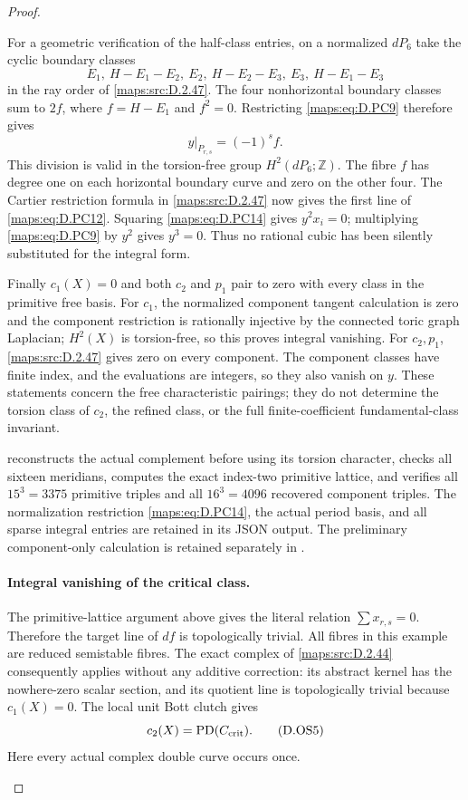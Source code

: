 \begin{proof}
\begin{enumerate}[label=\arabic*.,leftmargin=*]
For a geometric verification of the half-class entries, on a
normalized $dP_6$ take the cyclic boundary classes
\[
 E_1,\ H-E_1-E_2,\ E_2,\ H-E_2-E_3,\ E_3,\ H-E_1-E_3
                                                               \tag{D.PC13}\label{maps:eq:D.PC13}
\]
in the ray order of \ref{maps:src:D.2.47}. The four nonhorizontal boundary classes
sum to $2f$, where $f=H-E_1$ and $f^2=0$. Restricting \eqref{maps:eq:D.PC9}
therefore gives
\[
                         y|_{P_{r,s}}=(-1)^s f.            \tag{D.PC14}\label{maps:eq:D.PC14}
\]
This division is valid in the torsion-free group $H^2(dP_6;\mathbb Z)$.
The fibre $f$ has degree one on each horizontal boundary curve
and zero on the other four. The Cartier restriction formula in
\ref{maps:src:D.2.47} now gives the first line of \eqref{maps:eq:D.PC12}. Squaring \eqref{maps:eq:D.PC14}
gives $y^2x_i=0$; multiplying \eqref{maps:eq:D.PC9} by $y^2$ gives $y^3=0$.
Thus no rational cubic has been silently substituted for the
integral form.

Finally $c_1(X)=0$ and both $c_2$ and $p_1$ pair to zero with
every class in the primitive free basis. For $c_1$, the normalized
component tangent calculation is zero and the component restriction
is rationally injective by the connected toric graph Laplacian;
$H^2(X)$ is torsion-free, so this proves integral vanishing.
For $c_2,p_1$, \ref{maps:src:D.2.47} gives zero on every component. The component
classes have finite index, and the evaluations are integers, so they
also vanish on $y$. These statements concern the free characteristic
pairings; they do not determine the torsion class of $c_2$, the
refined class, or the full finite-coefficient fundamental-class
invariant.

reconstructs the actual complement before using its torsion
character, checks all sixteen meridians, computes the exact
index-two primitive lattice, and verifies all $15^3=3375$ primitive
triples and all $16^3=4096$ recovered component triples. The
normalization restriction \eqref{maps:eq:D.PC14}, the actual period basis, and
all sparse integral entries are retained in its JSON output.
The preliminary component-only calculation is retained separately
in .

\paragraph{Integral vanishing of the critical class.}
The primitive-lattice argument above gives the literal relation
\(\sum x_{r,s}=0\). Therefore the target line of \(df\) is
topologically trivial. All fibres in this example are reduced
semistable fibres. The exact complex of \ref{maps:src:D.2.44} consequently
applies without any additive correction: its abstract kernel
has the nowhere-zero scalar section, and its quotient line is
topologically trivial because \(c_1(X)=0\). The local unit Bott
clutch gives
\[
                     c_2(X)=\operatorname{PD}(C_{\rm crit}).
                                                               \tag{D.OS5}\label{maps:eq:D.OS5}
\]
Here every actual complex double curve occurs once.


\end{enumerate}
\end{proof}
